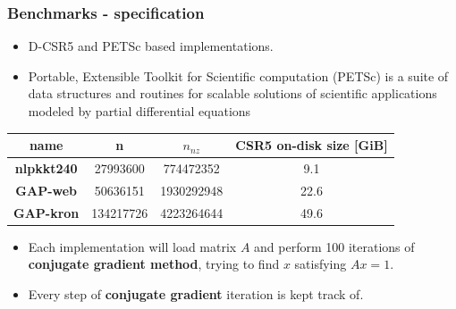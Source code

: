 \documentclass{beamer}
\begin{document}
\begin{frame}
    \frametitle{Benchmarks - specification}

    \begin{itemize}
        \item D-CSR5 and PETSc based implementations.
        \item Portable, Extensible Toolkit for Scientific computation (PETSc) is a suite of
              data structures and routines for scalable solutions of scientific applications
              modeled by partial differential equations

    \end{itemize}

    \centering
    \begin{tabular}{|c|c|c|c|}
        \hline
        \textbf{name}      & \textbf{n}      & $n_{nz}$         & \textbf{CSR5 on-disk size} [GiB] \\
        \hline
        \hline
        \textbf{nlpkkt240} & \num{27993600}  & \num{774472352}  & 9.1                              \\
        \hline
        \textbf{GAP-web}   & \num{50636151}  & \num{1930292948} & 22.6                             \\
        \hline
        \textbf{GAP-kron}  & \num{134217726} & \num{4223264644} & 49.6                             \\
        \hline
    \end{tabular}
    \begin{itemize}
        \item Each implementation will load matrix $A$ and perform 100 iterations of \textbf{conjugate
                  gradient method}, trying to find $x$ satisfying $Ax=1$.
        \item Every step of \textbf{conjugate gradient} iteration is kept track of.
    \end{itemize}
\end{frame}
\end{document}

